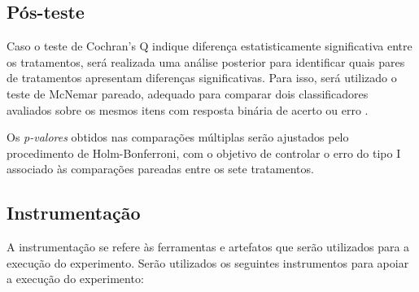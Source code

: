 \subsection{Pós-teste}

Caso o teste de Cochran's Q indique diferença estatisticamente significativa entre os tratamentos, será realizada uma análise posterior para identificar
quais pares de tratamentos apresentam diferenças significativas. Para isso, será utilizado o teste de McNemar pareado, adequado para comparar dois
classificadores avaliados sobre os mesmos itens com resposta binária de acerto ou erro \cite{conover1999practical}.

Os \textit{p-valores} obtidos nas comparações múltiplas serão ajustados pelo procedimento de Holm-Bonferroni, com o objetivo de controlar o erro do tipo I 
associado às comparações pareadas entre os sete tratamentos.

\subsection{Instrumentação}

A instrumentação se refere às ferramentas e artefatos que serão utilizados para a
execução do experimento. Serão utilizados os seguintes instrumentos para apoiar a execução do experimento:

